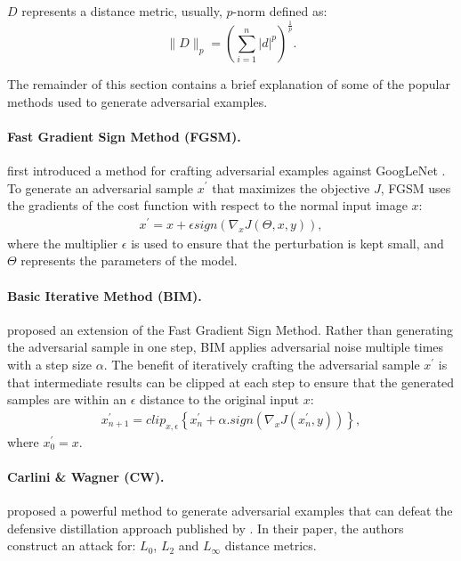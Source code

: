 $D$ represents a distance metric, usually, $p$-norm defined as:
\begin{equation} \label{eq:p-norm}
    \lVert D
    \lVert_{p}=\left(\sum_{i=1}^{n}|d|^{p}\right)^{\frac{1}{p}}.
\end{equation}

The remainder of this section contains a brief explanation of some of the
popular methods used to generate adversarial examples.

\paragraph{Fast Gradient Sign Method (FGSM).}
\cite{goodfellow_explaining_2015} first introduced a method for crafting
adversarial examples against GoogLeNet \cite{szegedy_going_2014}. To generate an
adversarial sample $x^{\prime}$ that maximizes the objective $J$, FGSM uses the
gradients of the cost function with respect to the normal input image $x$:
\begin{align} \label{eq:fgsm} x^{\prime}=x+\epsilon
    sign\left(\nabla_{x}J\left(\Theta,x,y\right)\right),\end{align} where the
multiplier $\epsilon$ is used to ensure that the perturbation is kept small, and
$\Theta$ represents the parameters of the model.

\paragraph{Basic Iterative Method (BIM).}
\cite{kurakin_adversarial_2017} proposed an extension of the Fast Gradient Sign
Method. Rather than generating the adversarial sample in one step, BIM
applies adversarial noise multiple times with a step size $\alpha$. The benefit
of iteratively crafting the adversarial sample $x^{\prime}$ is that intermediate
results can be clipped at each step to ensure that the generated samples are
within an $\epsilon$ distance to the original input $x$:
\begin{align} \label{eq:bim}
    x^{\prime}_{n+1}=clip_{x,\epsilon}
    \left\{ x^{\prime}_{n}+\alpha.sign\left(\nabla_{x}J\left(x^{\prime}_{n},y\right)\right)\right\},
\end{align}
where $x^{\prime}_{0}=x$.

\paragraph{Carlini \& Wagner (CW).}
\cite{carlini_towards_2017} proposed a powerful method to
generate adversarial examples that can defeat the defensive distillation
approach published by \cite{papernot_distillation_2016}.
In their paper, the authors construct an attack for: $L_{0}$, $L_{2}$ and
$L_{\infty}$ distance metrics.

